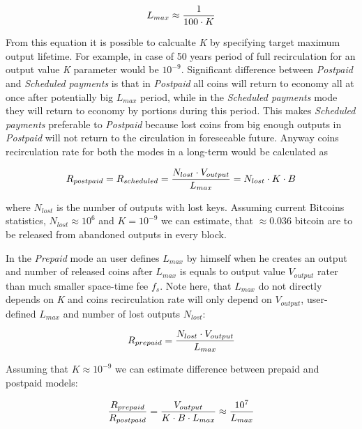 \documentclass[]{article}   %
\begin{document}
\begin{equation}
{L_{max} \approx {1 \over 100 \cdot K}}
\end{equation}

From this equation it is possible to calcualte \textit{K} by specifying target maximum output lifetime. For example, in case of 50 years period of full recirculation for an output value \textit{K} parameter would be $10^{-9}$. Significant difference between \textit{Postpaid} and \textit{Scheduled payments} is that in \textit{Postpaid} all coins will return to economy all at once after potentially big $L_{max}$ period, while in the \textit{Scheduled payments} mode they will return to economy by portions during this period. This makes \textit{Scheduled payments} preferable to \textit{Postpaid} because lost coins from big enough outputs in \textit{Postpaid} will not return to the circulation in foreseeable future. Anyway coins recirculation rate for both the modes in a long-term would be calculated as

\begin{equation}
R_{postpaid} = R_{scheduled} = {N_{lost} \cdot V_{output} \over L_{max}} = {N_{lost} \cdot K \cdot B}
\end{equation}

where $N_{lost}$ is the number of outputs with lost keys. Assuming current Bitcoins statistics, $N_{lost}\approx10^6$ and $K = 10^{-9}$ we can estimate, that $\approx0.036$ bitcoin are to be released from abandoned outputs in every block.

In the \textit{Prepaid} mode an user defines $L_{max}$ by himself when he creates an output and number of released coins after $L_{max}$ is equals to output value $V_{output}$ rater than much smaller space-time fee $f_s$. Note here, that $L_{max}$ do not directly depends on \textit{K} and coins recirculation rate will only depend on $V_{output}$, user-defined $L_{max}$ and number of lost outputs $N_{lost}$:

\begin{equation}
R_{prepaid} = {N_{lost} \cdot V_{output} \over L_{max}}
\end{equation}

Assuming that $K\approx10^{-9}$ we can estimate difference between prepaid and postpaid models:

\begin{equation}
{R_{prepaid} \over R_{postpaid}} = {V_{output} \over  K \cdot B \cdot L_{max}} \approx {10^7 \over L_{max}}
\end{equation}
\end{document}
